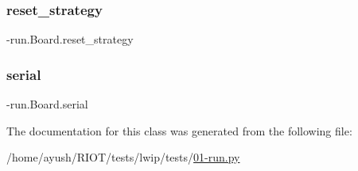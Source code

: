 \mbox{\label{class01-run_1_1Board_a1338e87bc761be6fc419ebb8a88d6114}} 
\subsubsection{\texorpdfstring{reset\+\_\+strategy}{reset\_strategy}}
{\footnotesize{}-\/run.\+Board.\+reset\+\_\+strategy}

\mbox{\label{class01-run_1_1Board_a51cd30d7dd75df818803f51e7de5e65d}} 
\subsubsection{\texorpdfstring{serial}{serial}}
{\footnotesize{}-\/run.\+Board.\+serial}



The documentation for this class was generated from the following file\+:\begin{DoxyCompactItemize}
\item 
/home/ayush/\+R\+I\+O\+T/tests/lwip/tests/\hyperlink{lwip_2tests_201-run_8py}{01-\/run.\+py}\end{DoxyCompactItemize}
